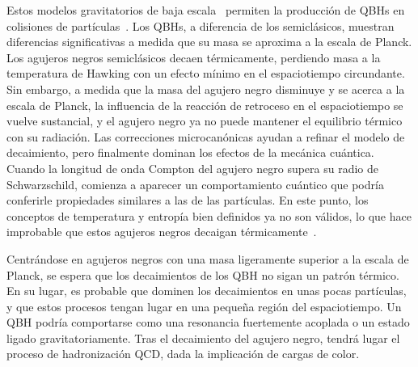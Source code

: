 Estos modelos gravitatorios de baja escala~\cite{Antoniadis_Arkani_Dimopoulos_Dvali-1998,ADD-1998,RS1-1999_1,RS1-1999_2,Dvali-2008,Dvali-2010} permiten la producción de \acp{QBH} en colisiones de partículas~\cite{Argyres-1998,Banks-1999,Giddings-2002}.
Los \acp{QBH}, a diferencia de los semiclásicos, muestran diferencias significativas a medida que su masa se aproxima a la escala de Planck. Los agujeros negros semiclásicos decaen térmicamente, perdiendo masa a la temperatura de Hawking con un efecto mínimo en el espaciotiempo circundante. Sin embargo, a medida que la masa del agujero negro disminuye y se acerca a la escala de Planck, la influencia de la reacción de retroceso en el espaciotiempo se vuelve sustancial, y el agujero negro ya no puede mantener el equilibrio térmico con su radiación. Las correcciones microcanónicas ayudan a refinar el modelo de decaimiento, pero finalmente dominan los efectos de la mecánica cuántica. Cuando la longitud de onda Compton del agujero negro supera su radio de Schwarzschild, comienza a aparecer un comportamiento cuántico que podría conferirle propiedades similares a las de las partículas. En este punto, los conceptos de temperatura y entropía bien definidos ya no son v\'alidos, lo que hace improbable que estos agujeros negros decaigan térmicamente~\cite{Meade-2008,Alberghi-2006,Alberghi-2007}.

Centr\'andose en agujeros negros con una masa ligeramente superior a la escala de Planck, se espera que los decaimientos de los \ac{QBH} no sigan un patrón térmico. En su lugar, es probable que dominen los decaimientos en unas pocas partículas, y que estos procesos tengan lugar en una pequeña región del espaciotiempo. Un \ac{QBH} podría comportarse como una resonancia fuertemente acoplada o un estado ligado gravitatoriamente. Tras el decaimiento del agujero negro, tendrá lugar el proceso de hadronización \ac{QCD}, dada la implicación de cargas de color.

